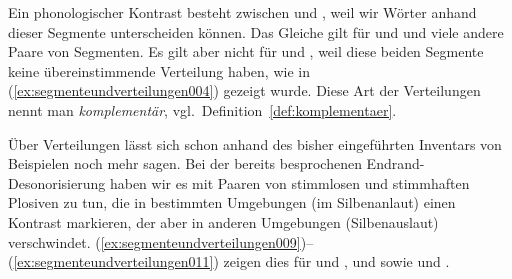 
Ein phonologischer Kontrast besteht \zB zwischen \textipa{[t]} und \textipa{[k]}, weil wir Wörter anhand dieser Segmente unterscheiden können.
Das Gleiche gilt für \textipa{[s]} und \textipa{[z]} und viele andere Paare von Segmenten.
Es gilt aber nicht für \textipa{[h]} und \textipa{[N]}, weil diese beiden Segmente keine übereinstimmende Verteilung haben, wie in (\ref{ex:segmenteundverteilungen004}) gezeigt wurde.
Diese Art der Verteilungen nennt man \textit{komplementär}, vgl.\ Definition~\ref{def:komplementaer}.


Über Verteilungen lässt sich schon anhand des bisher eingeführten Inventars von Beispielen noch mehr sagen.
Bei der bereits besprochenen Endrand-Desonorisierung haben wir es mit Paaren von stimmlosen und stimmhaften Plosiven zu tun, die in bestimmten Umgebungen (im Silbenanlaut) einen Kontrast markieren, der aber in anderen Umgebungen (Silbenauslaut) verschwindet.
(\ref{ex:segmenteundverteilungen009})--(\ref{ex:segmenteundverteilungen011}) zeigen dies für \textipa{[g]} und \textipa{[k]}, \textipa{[d]} und \textipa{[t]} sowie \textipa{[b]} und \textipa{[p]}.

\begin{exe}
  \ex\label{ex:segmenteundverteilungen009}
  \begin{xlist}
  \end{xlist}
  \ex\label{ex:segmenteundverteilungen010}
  \begin{xlist}
  \end{xlist}
  \ex\label{ex:segmenteundverteilungen011}
  \begin{xlist}
  \end{xlist}
\end{exe}

